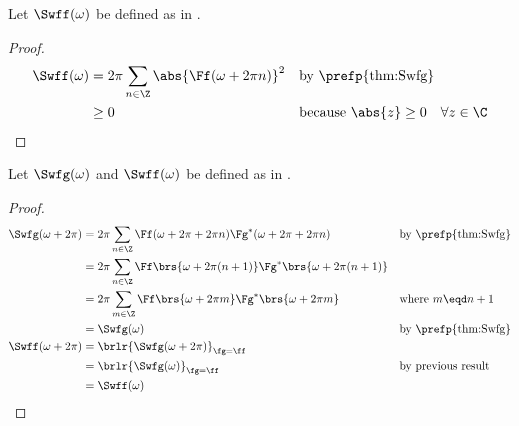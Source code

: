 \begin{proposition}
\label{prop:ps_nonnegative}
Let $\Swff(\omega)$ be defined as in .
\end{proposition}
\begin{proof}
\begin{align*}
  \Swff(\omega)
    &= {2\pi}\sum_{n\in\Z} \abs{\Ff(\omega+2\pi n)}^2
    && \text{by \prefp{thm:Swfg}}
  \\&\ge 0
    && \text{because $\abs{z}\ge0\quad\forall z\in\C$}
\end{align*}
\end{proof}

\begin{proposition}
\label{prop:ps_periodic}
Let $\Swfg(\omega)$ and $\Swff(\omega)$ be defined as in .
\end{proposition}
\begin{proof}
\begin{align*}
  \Swfg(\omega+2\pi)
    &= {2\pi}\sum_{n\in\Z} \Ff(\omega+2\pi+2\pi n) \Fg^\ast(\omega+2\pi+2\pi n)
    && \text{by \prefp{thm:Swfg}}
  \\&= {2\pi}\sum_{n\in\Z} \Ff\brs{\omega+2\pi(n+1)} \Fg^\ast\brs{\omega+2\pi(n+1)}
  \\&= {2\pi}\sum_{m\in\Z} \Ff\brs{\omega+2\pi m} \Fg^\ast\brs{\omega+2\pi m}
    && \text{where $m\eqd n+1$}
  \\&= \Swfg(\omega)
    && \text{by \prefp{thm:Swfg}}
  \\
  \Swff(\omega+2\pi)
    &= \brlr{\Swfg(\omega+2\pi)}_{\fg=\ff}
  \\&= \brlr{\Swfg(\omega)}_{\fg=\ff}
    && \text{by previous result}
  \\&= \Swff(\omega)
\end{align*}
\end{proof}


